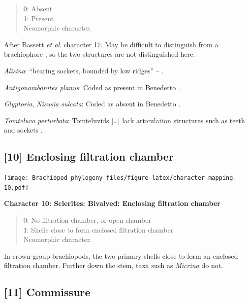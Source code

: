 \documentclass[openany]{book}
\theoremstyle{definition}
\theoremstyle{definition}
\theoremstyle{definition}
\theoremstyle{remark}
\begin{document}
\begin{quote}
0: Absent\\
1: Present\\
Neomorphic character.
\end{quote}

After Bassett \emph{et al}.
\citeyearpar{Bassett2001Functionalmorphology} character 17. May be
difficult to distinguish from a brachiophore \citep[see Fig 323
in][]{Williams1997Introduction}, so the two structures are not
distinguished here.

\hypertarget{Alisina-coding-9}{}
\emph{Alisina}: ``bearing sockets, bounded by low ridges'' --
\citet{Williams2000LinguliformeaCraniiformea}.

\hypertarget{Antigonambonites_planus-coding-9}{}
\emph{Antigonambonites planus}: Coded as present in Benedetto
\citeyearpar{Benedetto2009iChaniella}.

\hypertarget{Glyptoria-coding-9}{}
\emph{Glyptoria}, \emph{Nisusia sulcata}: Coded as absent in Benedetto
\citeyearpar{Benedetto2009iChaniella}.

\hypertarget{Tomteluva_perturbata-coding-9}{}
\emph{Tomteluva perturbata}: Tomteluvids {[}\ldots{}{]} lack
articulation structures such as teeth and sockets
\citep{Streng2016Anew}.

\subsection*{{[}10{]} Enclosing filtration
chamber}\label{enclosing-filtration-chamber}

\texttt{[image: Brachiopod\_phylogeny\_files/figure-latex/character-mapping-10.pdf]}

\textbf{Character 10: Sclerites: Bivalved: Enclosing filtration chamber}

\begin{quote}
0: No filtration chamber, or open chamber\\
1: Shells close to form enclosed filtration chamber\\
Neomorphic character.
\end{quote}

In crown-group brachiopods, the two primary shells close to form an
enclosed filtration chamber. Further down the stem, taxa such as
\emph{Micrina} do not.

\subsection*{{[}11{]} Commissure}\label{commissure}
\end{document}
